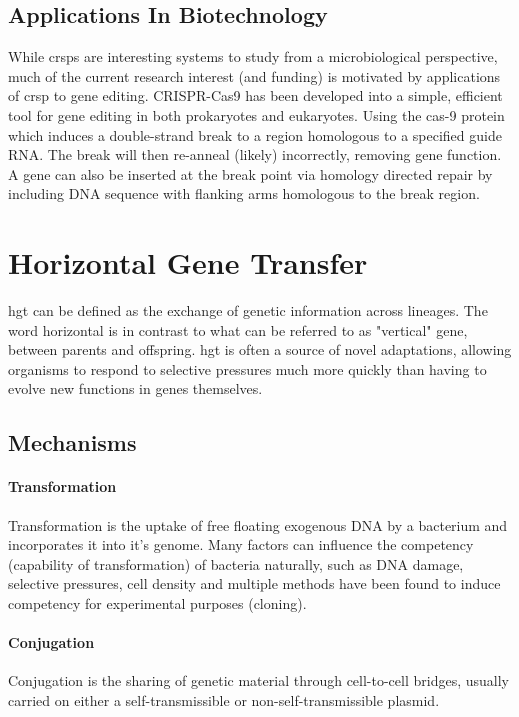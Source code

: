 \documentclass[12pt,letter]{article}
\begin{document}
\subsection{Applications In Biotechnology}
While \ac{crsp}s are interesting systems to study from a microbiological perspective, much of the current research interest (and funding) is motivated by applications of \ac{crsp} to gene editing.
CRISPR-Cas9 has been developed into a simple, efficient tool for gene editing in both prokaryotes and eukaryotes\citep{crispgen}.
Using the \ac{cas}-9 protein which induces a double-strand break to a region homologous to a specified guide RNA.
The break will then  re-anneal (likely) incorrectly, removing gene function\citep{crispgen}.
A gene can also be inserted at the break point via homology directed repair by including DNA sequence with flanking arms homologous to the break region\citep{crispgen}.
\section{Horizontal Gene Transfer}
\ac{hgt} can be defined as the exchange of genetic information across lineages\citep{lgt}.
The word horizontal is in contrast to what can be referred to as "vertical" gene, between parents and offspring\citep{ihgt}.
\ac{hgt} is often a source of novel adaptations, allowing organisms to respond to selective pressures much more quickly than having to evolve new functions in genes themselves\citep{ihgt,adaevo}.\par
\subsection{Mechanisms}
\paragraph{Transformation}
Transformation is the uptake of free floating exogenous DNA by a bacterium and incorporates it into it's genome\citep{lgt}.
Many factors can influence the competency (capability of transformation) of bacteria naturally, such as DNA damage, selective pressures, cell density and multiple methods have been found to induce competency for experimental purposes (cloning)\citep{natcomp}.
\paragraph{Conjugation}
Conjugation is the sharing of genetic material through cell-to-cell bridges, usually carried on either a self-transmissible or non-self-transmissible plasmid\citep{conjug}.
\end{document}

